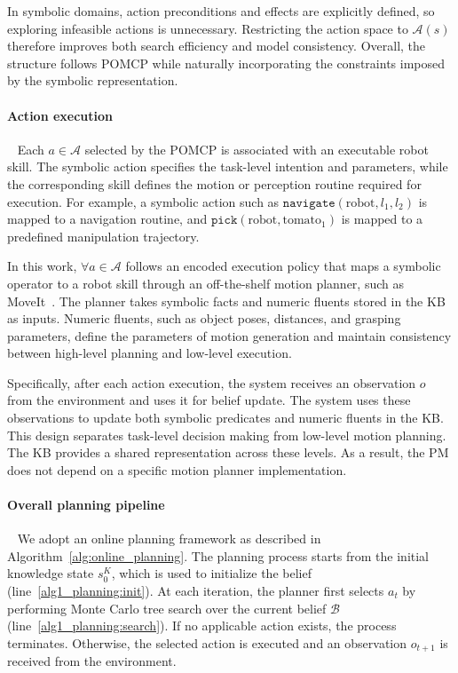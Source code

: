 In symbolic domains, action preconditions and effects are explicitly defined, so exploring infeasible actions is unnecessary. Restricting the action space to $\mathcal{A}(s)$ therefore improves both search efficiency and model consistency. Overall, the structure follows POMCP while naturally incorporating the constraints imposed by the symbolic representation.


\paragraph{Action execution}~\label{method:action_execution}
Each $a \in \mathcal{A}$ selected by the POMCP is associated with an executable robot skill. The symbolic action specifies the task-level intention and parameters, while the corresponding skill defines the motion or perception routine required for execution. For example, a symbolic action such as $\texttt{navigate}(\text{robot}, l_1, l_2)$ is mapped to a navigation routine, and $\texttt{pick}(\text{robot}, \text{tomato}_1)$ is mapped to a predefined manipulation trajectory.


In this work, $\forall a \in \mathcal{A}$ follows an encoded execution policy that maps a symbolic operator to a robot skill through an off-the-shelf motion planner, such as MoveIt~\cite{chitta2012moveit}. The planner takes symbolic facts and numeric fluents stored in the KB as inputs. Numeric fluents, such as object poses, distances, and grasping parameters, define the parameters of motion generation and maintain consistency between high-level planning and low-level execution.


Specifically, after each action execution, the system receives an observation $o$ from the environment and uses it for belief update. The system uses these observations to update both symbolic predicates and numeric fluents in the KB. This design separates task-level decision making from low-level motion planning. The KB provides a shared representation across these levels. As a result, the PM does not depend on a specific motion planner implementation.


\paragraph{Overall planning pipeline}~\label{method:planning}
We adopt an online planning framework as described in Algorithm~\ref{alg:online_planning}. The planning process starts from the initial knowledge state $s^{K}_{0}$, which is used to initialize the belief (line~\ref{alg1_planning:init}). At each iteration, the planner first selects $a_t$ by performing Monte Carlo tree search over the current belief $\mathcal{B}$ (line~\ref{alg1_planning:search}). If no applicable action exists, the process terminates. Otherwise, the selected action is executed and an observation $o_{t+1}$ is received from the environment.


